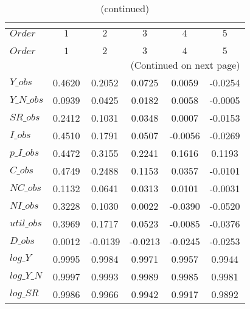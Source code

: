  
\begin{center}
\begin{longtable}{lccccc} 
\caption{COEFFICIENTS OF AUTOCORRELATION}\\
 \label{Table:th_autocorr_matrix}\\
\toprule 
$Order      $	 & 	 $         1$	 & 	 $         2$	 & 	 $         3$	 & 	 $         4$	 & 	 $         5$\\
\midrule \endfirsthead 
\caption{(continued)}\\
 \toprule \\ 
$Order      $	 & 	 $         1$	 & 	 $         2$	 & 	 $         3$	 & 	 $         4$	 & 	 $         5$\\
\midrule \endhead 
\midrule \multicolumn{6}{r}{(Continued on next page)} \\ \bottomrule \endfoot 
\bottomrule \endlastfoot 
$Y\_obs     $	 & 	    0.4620	 & 	    0.2052	 & 	    0.0725	 & 	    0.0059	 & 	   -0.0254 \\ 
$Y\_N\_obs  $	 & 	    0.0939	 & 	    0.0425	 & 	    0.0182	 & 	    0.0058	 & 	   -0.0005 \\ 
$SR\_obs    $	 & 	    0.2412	 & 	    0.1031	 & 	    0.0348	 & 	    0.0007	 & 	   -0.0153 \\ 
$I\_obs     $	 & 	    0.4510	 & 	    0.1791	 & 	    0.0507	 & 	   -0.0056	 & 	   -0.0269 \\ 
$p\_I\_obs  $	 & 	    0.4472	 & 	    0.3155	 & 	    0.2241	 & 	    0.1616	 & 	    0.1193 \\ 
$C\_obs     $	 & 	    0.4749	 & 	    0.2488	 & 	    0.1153	 & 	    0.0357	 & 	   -0.0101 \\ 
$NC\_obs    $	 & 	    0.1132	 & 	    0.0641	 & 	    0.0313	 & 	    0.0101	 & 	   -0.0031 \\ 
$NI\_obs    $	 & 	    0.3228	 & 	    0.1030	 & 	    0.0022	 & 	   -0.0390	 & 	   -0.0520 \\ 
$util\_obs  $	 & 	    0.3969	 & 	    0.1717	 & 	    0.0523	 & 	   -0.0085	 & 	   -0.0376 \\ 
$D\_obs     $	 & 	    0.0012	 & 	   -0.0139	 & 	   -0.0213	 & 	   -0.0245	 & 	   -0.0253 \\ 
$log\_Y     $	 & 	    0.9995	 & 	    0.9984	 & 	    0.9971	 & 	    0.9957	 & 	    0.9944 \\ 
$log\_Y\_N  $	 & 	    0.9997	 & 	    0.9993	 & 	    0.9989	 & 	    0.9985	 & 	    0.9981 \\ 
$log\_SR    $	 & 	    0.9986	 & 	    0.9966	 & 	    0.9942	 & 	    0.9917	 & 	    0.9892 \\ 

\end{longtable}
\end{center}
